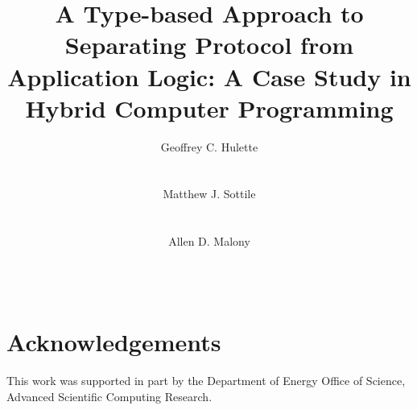 \documentclass{acm_proc_article-sp}
\begin{document}
\title{A Type-based Approach to Separating Protocol from Application Logic: A
Case Study in Hybrid Computer Programming}

\author{
\alignauthor
Geoffrey C. Hulette\\
\\
\\
\alignauthor
Matthew J. Sottile\\
\\
\\
\alignauthor
Allen D. Malony\\
\\
\\
}

\maketitle











\section{Acknowledgements}

This work was supported in part by the Department of Energy Office of Science,
Advanced Scientific Computing Research.



\end{document}
